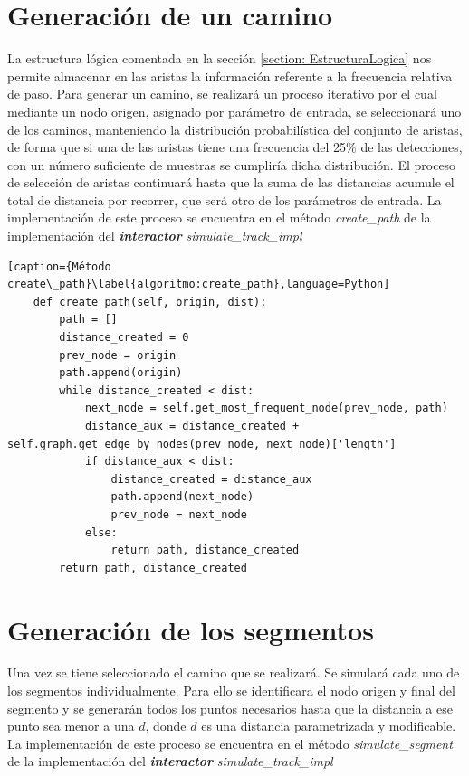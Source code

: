 \section{Generación de un camino}

La estructura lógica comentada en la sección \ref{section: EstructuraLogica} nos permite 
almacenar en las aristas la información referente a la frecuencia relativa de paso.
Para generar un camino, se realizará un proceso iterativo por el cual mediante un nodo origen, 
asignado por parámetro de entrada, se seleccionará uno de los caminos, manteniendo la 
distribución probabilística del conjunto de aristas, de forma que si una de las aristas tiene una 
frecuencia del 25\% de las detecciones, con un número suficiente de muestras se cumpliría dicha 
distribución. El proceso de selección de aristas continuará hasta que la suma de las distancias 
acumule el total de distancia por recorrer, que será otro de los parámetros de entrada.
La implementación de este proceso se encuentra en el método \textit{create\_path} de la 
implementación del \textbf{\textit{interactor}} \textit{simulate\_track\_impl}

\begin{lstlisting}[caption={Método create\_path}\label{algoritmo:create_path},language=Python] 
    def create_path(self, origin, dist):
        path = []
        distance_created = 0
        prev_node = origin
        path.append(origin)
        while distance_created < dist:
            next_node = self.get_most_frequent_node(prev_node, path)
            distance_aux = distance_created + self.graph.get_edge_by_nodes(prev_node, next_node)['length']
            if distance_aux < dist:
                distance_created = distance_aux
                path.append(next_node)
                prev_node = next_node
            else:
                return path, distance_created
        return path, distance_created
\end{lstlisting}

\section{Generación de los segmentos}

Una vez se tiene seleccionado el camino que se realizará. Se simulará cada uno de los segmentos individualmente.
Para ello se identificara el nodo origen y final del segmento y se generarán todos los puntos necesarios hasta
que la distancia a ese punto sea menor a una $d$, donde $d$ es una distancia parametrizada y modificable. 
La implementación de este proceso se encuentra en el método \textit{simulate\_segment} de la implementación 
del \textbf{\textit{interactor}} \textit{simulate\_track\_impl}

